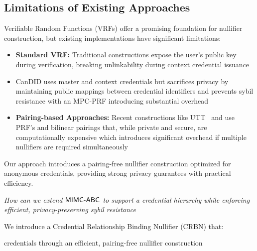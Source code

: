 \subsection{Limitations of Existing Approaches}

Verifiable Random Functions (VRFs) offer a promising foundation for nullifier construction, but existing implementations have significant limitations:

\begin{itemize}
    \item \textbf{Standard VRF:} Traditional constructions expose the user's public key during verification, breaking unlinkability during context credential issuance \cite{hutchison_verifiable_2005}

    \item CanDID \cite{maram2021candid} uses master and context credentials but sacrifices privacy by maintaining public mappings between credential identifiers and prevents sybil resistance with an MPC-PRF introducing substantial overhead

    \item \textbf{Pairing-based Approaches:} Recent constructions like UTT~\cite{tomescu2022utt} and \cite{rabaninejad_attribute-based_2024} use PRF's and bilinear pairings that, while private and secure, are computationally expensive which introduces significant overhead if multiple nullifiers are required simultaneously 
\end{itemize}





















Our approach introduces a pairing-free nullifier construction optimized for anonymous credentials, providing strong privacy guarantees with practical efficiency.


\begin{center} 
    \emph{How can we extend $\mathsf{MIMC\text{-}ABC}$ to support a credential hierarchy while enforcing efficient, privacy-preserving sybil resistance}
\end{center}


We introduce a Credential Relationship Binding Nullifier (CRBN) that:

 credentials through an efficient, pairing-free nullifier construction

